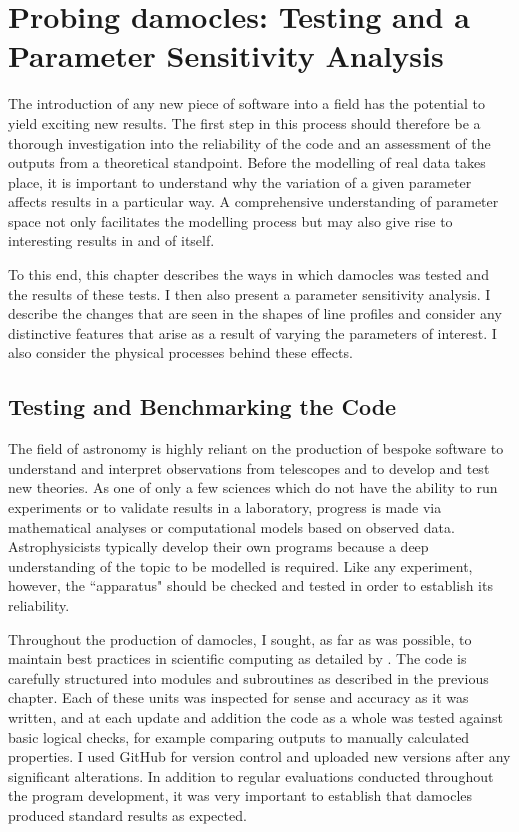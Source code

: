 

%
%
\chapter{Probing {\sc damocles}:  Testing and a Parameter Sensitivity Analysis}\label{chp:chp4}

The introduction of any new piece of software into a field has the potential to yield exciting new results.  The first step in this process should therefore be a thorough investigation into the reliability of the code and an assessment of the outputs from a theoretical standpoint.  Before the modelling of real data takes place, it is important to understand why the variation of a  given parameter affects results in a particular way.  A comprehensive understanding of parameter space not only facilitates the modelling process but may also give rise to interesting results in and of itself.

To this end, this chapter describes the ways in which {\sc damocles} was tested and the results of these tests.  I then also present a parameter sensitivity analysis.  I describe the changes that are seen in the shapes of line profiles and consider any distinctive features that arise as a result of varying the parameters of interest.  I also consider the physical processes behind these effects.


\section{Testing and Benchmarking the Code}

The field of astronomy is highly reliant on the production of bespoke software to understand and interpret observations from telescopes and to develop and test new theories.  As one of only a few sciences which do not have the ability to run experiments or to validate results in a laboratory, progress is made via mathematical analyses or computational models based on observed data.  Astrophysicists typically develop their own programs because a deep understanding of the topic to be modelled is required.  Like any experiment, however, the ``apparatus" should be checked and tested in order to establish its reliability.

Throughout the production of {\sc damocles}, I sought, as far as was possible, to maintain best practices in scientific computing as detailed by \citet{Wilson2012}.  The code is carefully structured into modules and subroutines as described in the previous chapter.  Each of these units was inspected for sense and accuracy as it was written, and at each update and addition the code as a whole was tested against basic logical checks, for example comparing outputs to manually calculated properties.  I used GitHub for version control and uploaded new versions after any significant alterations.  In addition to regular evaluations conducted throughout the program development, it was very important to establish that {\sc damocles} produced standard results as expected.

